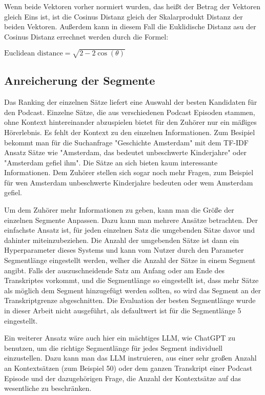 Wenn beide Vektoren vorher normiert wurden, das heißt der Betrag der Vektoren gleich Eins ist, ist die Cosinus Distanz gleich der Skalarprodukt Distanz der beiden Vektoren.
Außerdem kann in diesem Fall die Euklidische Distanz asu der Cosinus Distanz errechnet werden durch die Formel: 

$\text{Euclidean distance} = \sqrt{2 - 2 \cos(\theta)}$



\subsection{Anreicherung der Segmente}

Das Ranking der einzelnen Sätze liefert eine Auswahl der besten Kandidaten für den Podcast.
Einzelne Sätze, die aus verschiedenen Podcast Episoden stammen, ohne Kontext hintereinander abzuspielen bietet für den Zuhörer nur ein mäßiges Hörerlebnis. 
Es fehlt der Kontext zu den einzelnen Informationen.
Zum Besipiel bekommt man für die Suchanfrage "Geschichte Amsterdam" mit dem TF-IDF Ansatz Sätze wie "Amsterdam, das bedeutet unbeschwerte Kinderjahre" oder "Amsterdam gefiel ihm".
Die Sätze an sich bieten kaum interessante Informationen.
Dem Zuhörer stellen sich sogar noch mehr Fragen, zum Beispiel für wen Amsterdam unbeschwerte Kinderjahre bedeuten oder wem Amsterdam gefiel.

Um dem Zuhörer mehr Informationen zu geben, kann man die Größe der einzelnen Segmente Anpassen.
Dazu kann man mehrere Ansätze betrachten.
Der einfachste Ansatz ist, für jeden einzelnen Satz die umgebenden Sätze davor und dahinter miteinzubeziehen.
Die Anzahl der umgebenden Sätze ist dann ein Hyperparameter dieses Systems und kann vom Nutzer durch den Parameter Segmentlänge eingestellt werden, welher die Anzahl der Sätze in einem Segment angibt.
Falls der auszuschneidende Satz am Anfang oder am Ende des Transkriptes vorkommt, und die Segmentlänge so eingestellt ist, dass mehr Sätze als möglich dem Segment hinzugefügt werden sollten, so wird das Segment an der Transkriptgrenze abgeschnitten.
Die Evaluation der besten Segmentlänge wurde in dieser Arbeit nicht ausgeführt, als defaultwert ist für die Segmentlänge 5 eingestellt.

Ein weiterer Ansatz wäre auch hier ein mächtiges LLM, wie ChatGPT zu benutzen, um die richtige Segmentlänge für jedes Segment individuell einzustellen.
Dazu kann man das LLM instruieren, aus einer sehr großen Anzahl an Kontextsätzen (zum Beispiel 50) oder dem ganzen Transkript einer Podcast Episode und der dazugehörigen Frage, die Anzahl der Kontextsätze auf das wesentliche zu beschränken.

